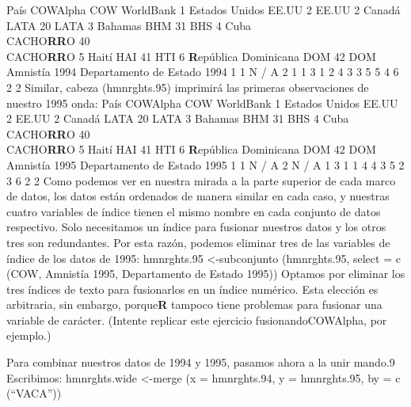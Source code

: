 \documentclass[
]{book}
\begin{document}
País COWAlpha COW WorldBank
1 Estados Unidos EE.UU 2 EE.UU
2 Canadá LATA 20 LATA
3 Bahamas BHM 31 BHS
4 Cuba\\
CACHO\textbf{RR}O 40\\
CACHO\textbf{RR}O
5 Haití HAI 41 HTI
6 \textbf{R}epública Dominicana DOM 42 DOM
Amnistía 1994 Departamento de Estado 1994
1 1 N / A
2 1 1
3 1 2
4 3 3
5 5 4
6 2 2
Similar, cabeza (hmnrghts.95) imprimirá las primeras observaciones de nuestro 1995
onda:
País COWAlpha COW WorldBank
1 Estados Unidos EE.UU 2 EE.UU
2 Canadá LATA 20 LATA
3 Bahamas BHM 31 BHS
4 Cuba\\
CACHO\textbf{RR}O 40\\
CACHO\textbf{RR}O
5 Haití HAI 41 HTI
6 \textbf{R}epública Dominicana DOM 42 DOM
Amnistía 1995 Departamento de Estado 1995
1 1 N / A
2 N / A 1
3 1 1
4 4 3
5 2 3
6 2 2
Como podemos ver en nuestra mirada a la parte superior de cada marco de datos, los datos están ordenados de manera similar en cada caso, y nuestras cuatro variables de índice tienen el mismo nombre en cada conjunto de datos respectivo. Solo necesitamos un índice para fusionar nuestros datos y los otros tres son redundantes. Por esta razón, podemos eliminar tres de las variables de índice de los datos de 1995:
hmnrghts.95 \textless-subconjunto (hmnrghts.95,
select = c (COW, Amnistía 1995, Departamento de Estado 1995))
Optamos por eliminar los tres índices de texto para fusionarlos en un índice numérico. Esta elección es arbitraria, sin embargo, porque\textbf{R} tampoco tiene problemas para fusionar una variable de carácter. (Intente replicar este ejercicio fusionandoCOWAlpha, por ejemplo.)

Para combinar nuestros datos de 1994 y 1995, pasamos ahora a la unir mando.9
Escribimos:
hmnrghts.wide \textless-merge (x = hmnrghts.94, y = hmnrghts.95, by = c (``VACA''))
\end{document}
